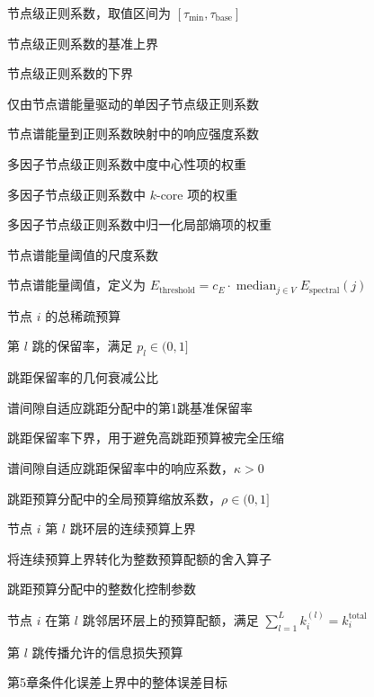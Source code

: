 \begin{denotation}[4.0cm]
  \item[$\tau(i)$] 节点级正则系数，取值区间为 $[\tau_{\min},\tau_{\mathrm{base}}]$
  \item[$\tau_{\mathrm{base}}$] 节点级正则系数的基准上界
  \item[$\tau_{\min}$] 节点级正则系数的下界
  \item[$\tau_{\mathrm{mono}}(i)$] 仅由节点谱能量驱动的单因子节点级正则系数
  \item[$\beta_{\tau}$] 节点谱能量到正则系数映射中的响应强度系数
  \item[$\gamma$] 多因子节点级正则系数中度中心性项的权重
  \item[$\delta$] 多因子节点级正则系数中 $k$-core 项的权重
  \item[$\omega_H$] 多因子节点级正则系数中归一化局部熵项的权重
  \item[$c_E$] 节点谱能量阈值的尺度系数
  \item[$E_{\mathrm{threshold}}$] 节点谱能量阈值，定义为 $E_{\mathrm{threshold}}=c_E\cdot \operatorname{median}_{j\in V}E_{\mathrm{spectral}}(j)$
  \item[$k_i^{\mathrm{total}}$] 节点 $i$ 的总稀疏预算
  \item[$p_l$] 第 $l$ 跳的保留率，满足 $p_l\in(0,1]$
  \item[$\varrho$] 跳距保留率的几何衰减公比
  \item[$p_{\mathrm{base}}$] 谱间隙自适应跳距分配中的第1跳基准保留率
  \item[$p_{\min}$] 跳距保留率下界，用于避免高跳距预算被完全压缩
  \item[$\kappa$] 谱间隙自适应跳距保留率中的响应系数，$\kappa>0$
  \item[$\rho$] 跳距预算分配中的全局预算缩放系数，$\rho\in(0,1]$
  \item[$\tilde{k}_i^{(l)}$] 节点 $i$ 第 $l$ 跳环层的连续预算上界
  \item[$\operatorname{RoundQuota}(\cdot)$] 将连续预算上界转化为整数预算配额的舍入算子
  \item[$\xi$] 跳距预算分配中的整数化控制参数
  \item[$k_i^{(l)}$] 节点 $i$ 在第 $l$ 跳邻居环层上的预算配额，满足 $\sum_{l=1}^{L}k_i^{(l)}=k_i^{\mathrm{total}}$
  \item[$\varepsilon_l$] 第 $l$ 跳传播允许的信息损失预算
  \item[$\varepsilon_{\mathrm{total}}$] 第5章条件化误差上界中的整体误差目标


\end{denotation}
